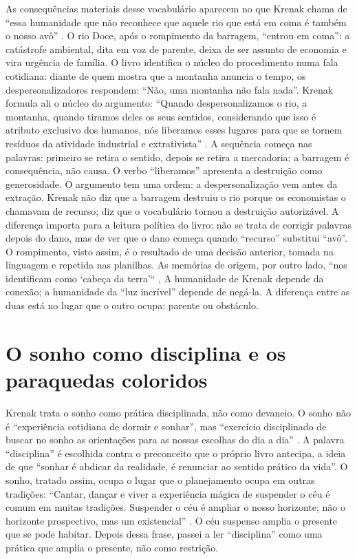 \documentclass[12pt]{article}
\begin{document}
As consequências materiais desse vocabulário aparecem no que Krenak chama de ``essa humanidade que não reconhece que aquele rio que está em coma é também o nosso avô'' \cite[pp. 47--48]{krenak2019}. O rio Doce, após o rompimento da barragem, ``entrou em coma'': a catástrofe ambiental, dita em voz de parente, deixa de ser assunto de economia e vira urgência de família. O livro identifica o núcleo do procedimento numa fala cotidiana: diante de quem mostra que a montanha anuncia o tempo, os despersonalizadores respondem: ``Não, uma montanha não fala nada''. Krenak formula ali o núcleo do argumento: ``Quando despersonalizamos o rio, a montanha, quando tiramos deles os seus sentidos, considerando que isso é atributo exclusivo dos humanos, nós liberamos esses lugares para que se tornem resíduos da atividade industrial e extrativista'' \cite[p. 49]{krenak2019}. A sequência começa nas palavras: primeiro se retira o sentido, depois se retira a mercadoria; a barragem é consequência, não causa. O verbo ``liberamos'' apresenta a destruição como generosidade. O argumento tem uma ordem: a despersonalização vem antes da extração. Krenak não diz que a barragem destruiu o rio porque os economistas o chamavam de recurso; diz que o vocabulário tornou a destruição autorizável. A diferença importa para a leitura política do livro: não se trata de corrigir palavras depois do dano, mas de ver que o dano começa quando ``recurso'' substitui ``avô''. O rompimento, visto assim, é o resultado de uma decisão anterior, tomada na linguagem e repetida nas planilhas. As memórias de origem, por outro lado, ``nos identificam como `cabeça da terra'`` \cite[p. 48]{krenak2019}, A humanidade de Krenak depende da conexão; a humanidade da ``luz incrível'' depende de negá-la. A diferença entre as duas está no lugar que o outro ocupa: parente ou obstáculo.

\section{O sonho como disciplina e os paraquedas coloridos}

Krenak trata o sonho como prática disciplinada, não como devaneio. O sonho não é ``experiência cotidiana de dormir e sonhar'', mas ``exercício disciplinado de buscar no sonho as orientações para as nossas escolhas do dia a dia'' \cite[p. 52]{krenak2019}. A palavra ``disciplina'' é escolhida contra o preconceito que o próprio livro antecipa, a ideia de que ``sonhar é abdicar da realidade, é renunciar ao sentido prático da vida''. O sonho, tratado assim, ocupa o lugar que o planejamento ocupa em outras tradições: ``Cantar, dançar e viver a experiência mágica de suspender o céu é comum em muitas tradições. Suspender o céu é ampliar o nosso horizonte; não o horizonte prospectivo, mas um existencial'' \cite[p. 32]{krenak2019}. O céu suspenso amplia o presente que se pode habitar. Depois dessa frase, passei a ler ``disciplina'' como uma prática que amplia o presente, não como restrição.
\end{document}
